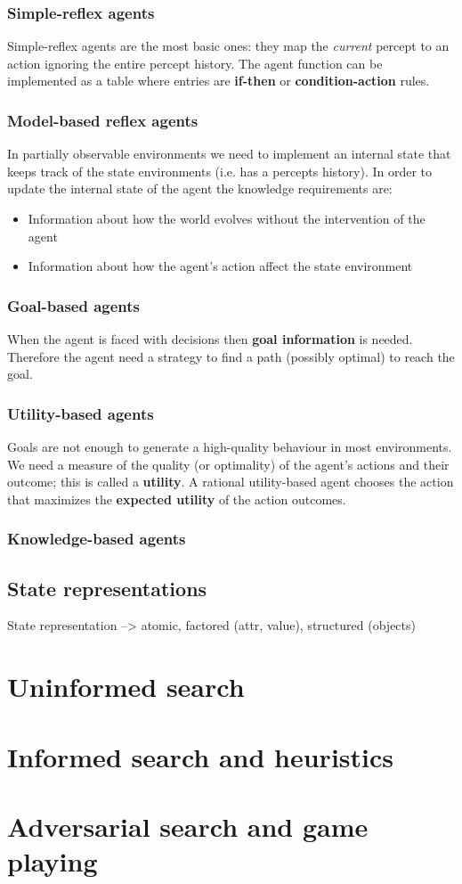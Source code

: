\documentclass[a4paper, 11pt]{article}
\begin{document}
\subsubsection*{Simple-reflex agents}
Simple-reflex agents are the most basic ones: they map the \emph{current} percept to an action ignoring the entire percept history.
The agent function can be implemented as a table where entries are \textbf{if-then} or \textbf{condition-action} rules.

\subsubsection*{Model-based reflex agents}
In partially observable environments we need to implement an internal state that keeps track of the state environments (i.e. has a percepts history).
In order to update the internal state of the agent the knowledge requirements are:
\begin{itemize}
  \item Information about how the world evolves without the intervention of the agent
  \item Information about how the agent's action affect the state environment
\end{itemize}

\subsubsection*{Goal-based agents}
When the agent is faced with decisions then \textbf{goal information} is needed. Therefore the agent need a strategy to find a path (possibly optimal) to reach the goal.

\subsubsection*{Utility-based agents}
Goals are not enough to generate a high-quality behaviour in most environments. We need a measure of the quality (or optimality) of the agent's actions and their outcome; this is called a \textbf{utility}. A rational utility-based agent chooses the action that maximizes the \textbf{expected utility} of the action outcomes.

\subsubsection*{Knowledge-based agents}


\subsection*{State representations}
State representation --> atomic, factored (attr, value), structured (objects)

\section{Uninformed search}

\section{Informed search and heuristics}
\section{Adversarial search and game playing}
\end{document}
